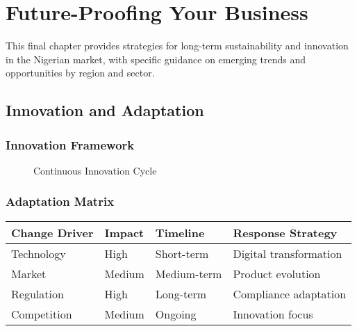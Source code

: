 
\chapter{Future-Proofing Your Business}

\begin{importantbox}
This final chapter provides strategies for long-term sustainability and innovation in the Nigerian market, with specific guidance on emerging trends and opportunities by region and sector.
\end{importantbox}

\FloatBarrier
\section{Innovation and Adaptation}

\subsection{Innovation Framework}
\begin{figure}[htbp]
    \centering
    \caption{Continuous Innovation Cycle}
    \label{fig:innovation-cycle}
\end{figure}

\subsection{Adaptation Matrix}
\begin{center}
\begin{tabularx}{\textwidth}{>{\raggedright\arraybackslash}X >{\centering\arraybackslash}X >{\centering\arraybackslash}X >{\raggedright\arraybackslash}X}
    \toprule
    \textbf{Change Driver} & \textbf{Impact} & \textbf{Timeline} & \textbf{Response Strategy} \\
    \midrule
    Technology & High & Short-term & Digital transformation \\
    Market & Medium & Medium-term & Product evolution \\
    Regulation & High & Long-term & Compliance adaptation \\
    Competition & Medium & Ongoing & Innovation focus \\
    \bottomrule
\end{tabularx}
\end{center}

